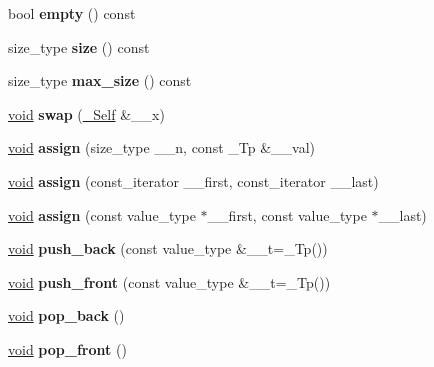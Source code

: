 \begin{DoxyCompactItemize}
bool {\bfseries empty} () const
\item 
\mbox{\label{classdeque_a6742ae6f3d0500ddc63857116badf7b1}} 
size\+\_\+type {\bfseries size} () const
\item 
\mbox{\label{classdeque_a1d5b708bad53263dbcfce7569d66906b}} 
size\+\_\+type {\bfseries max\+\_\+size} () const
\item 
\mbox{\label{classdeque_a33bb324e2a525a085c3a1df23990b184}} 
\hyperlink{interfacevoid}{void} {\bfseries swap} (\hyperlink{classdeque}{\+\_\+\+Self} \&\+\_\+\+\_\+x)
\item 
\mbox{\label{classdeque_aac993d1af3e42bcc0ffc3644e545b49d}} 
\hyperlink{interfacevoid}{void} {\bfseries assign} (size\+\_\+type \+\_\+\+\_\+n, const \+\_\+\+Tp \&\+\_\+\+\_\+val)
\item 
\mbox{\label{classdeque_ad31750de5d83743071b0ba68881f6e26}} 
\hyperlink{interfacevoid}{void} {\bfseries assign} (const\+\_\+iterator \+\_\+\+\_\+first, const\+\_\+iterator \+\_\+\+\_\+last)
\item 
\mbox{\label{classdeque_abd118d8d021843fb731812c177a9d387}} 
\hyperlink{interfacevoid}{void} {\bfseries assign} (const value\+\_\+type $\ast$\+\_\+\+\_\+first, const value\+\_\+type $\ast$\+\_\+\+\_\+last)
\item 
\mbox{\label{classdeque_a7e22cc3e68837513dbc503cc9f7b4dd1}} 
\hyperlink{interfacevoid}{void} {\bfseries push\+\_\+back} (const value\+\_\+type \&\+\_\+\+\_\+t=\+\_\+\+Tp())
\item 
\mbox{\label{classdeque_ac0c352c97b88b4a2699a3e3afd3f0c02}} 
\hyperlink{interfacevoid}{void} {\bfseries push\+\_\+front} (const value\+\_\+type \&\+\_\+\+\_\+t=\+\_\+\+Tp())
\item 
\mbox{\label{classdeque_ae7ae8102a53e4f72f853de9e79aa76df}} 
\hyperlink{interfacevoid}{void} {\bfseries pop\+\_\+back} ()
\item 
\mbox{\label{classdeque_a2d248dbded70706ad477b8548a9ffa7f}} 
\hyperlink{interfacevoid}{void} {\bfseries pop\+\_\+front} ()

\end{DoxyCompactItemize}
